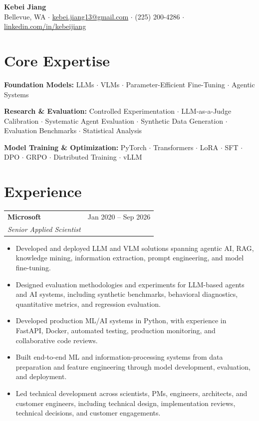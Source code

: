 \documentclass[10pt,letterpaper]{article}
\makeatletter
\newcommand{\headingwtitle}[3]{\vspace{2pt}\begin{tabularx}{\textwidth}{@{}Xr@{}}\textbf{#1} & #3\\[1pt] \textit{#2} & \end{tabularx}\vspace{-0pt}}
\makeatother
\begin{document}
\begin{center}
{\LARGE \textbf{Kebei Jiang}}\\[3pt]
Bellevue, WA \quad $\cdot$ \quad
\href{mailto:kebei.jiang13@gmail.com}{kebei.jiang13@gmail.com} \quad $\cdot$ \quad
(225) 200-4286 \quad $\cdot$ \quad
\href{https://www.linkedin.com/in/kebeijiang}{linkedin.com/in/kebeijiang}
\end{center}
\vspace{-3pt}

\section*{Core Expertise}
\textbf{Foundation Models:} LLMs $\cdot$ VLMs $\cdot$ Parameter-Efficient Fine-Tuning $\cdot$ Agentic Systems

\textbf{Research \& Evaluation:} Controlled Experimentation $\cdot$ LLM-as-a-Judge Calibration $\cdot$ Systematic Agent Evaluation $\cdot$ Synthetic Data Generation $\cdot$ Evaluation Benchmarks $\cdot$ Statistical Analysis

\textbf{Model Training \& Optimization:} PyTorch $\cdot$ Transformers $\cdot$ LoRA $\cdot$ SFT $\cdot$ DPO $\cdot$ GRPO $\cdot$ Distributed Training $\cdot$ vLLM

\section*{Experience}
\headingwtitle{Microsoft}{Senior Applied Scientist}{Jan 2020 -- Sep 2026}
\begin{itemize}
\item Developed and deployed LLM and VLM solutions spanning agentic AI, RAG, knowledge mining, information extraction, prompt engineering, and model fine-tuning.
\item Designed evaluation methodologies and experiments for LLM-based agents and AI systems, including synthetic benchmarks, behavioral diagnostics, quantitative metrics, and regression evaluation.
\item Developed production ML/AI systems in Python, with experience in FastAPI, Docker, automated testing, production monitoring, and collaborative code reviews.
\item Built end-to-end ML and information-processing systems from data preparation and feature engineering through model development, evaluation, and deployment.
\item Led technical development across scientists, PMs, engineers, architects, and customer engineers, including technical design, implementation reviews, technical decisions, and customer engagements.
\end{itemize}
\end{document}
